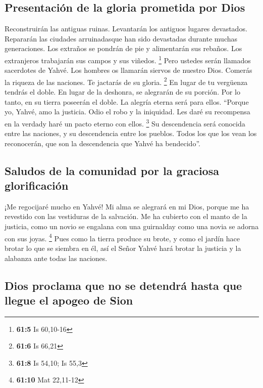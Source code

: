 \hypertarget{presentaciuxf3n-de-la-gloria-prometida-por-dios}{%
\subsection{Presentación de la gloria prometida por
Dios}\label{presentaciuxf3n-de-la-gloria-prometida-por-dios}}

 Reconstruirán las antiguas ruinas. Levantarán los
antiguos lugares devastados. Repararán las ciudades arruinadasque han
sido devastadas durante muchas generaciones.  Los extraños
se pondrán de pie y alimentarán sus rebaños. Los extranjeros trabajarán
sus campos y sus viñedos. \footnote{\textbf{61:5} Is 60,10-16}
 Pero ustedes serán llamados sacerdotes de Yahvé. Los
hombres os llamarán siervos de nuestro Dios. Comerás la riqueza de las
naciones. Te jactarás de su gloria. \footnote{\textbf{61:6} Is 66,21}
 En lugar de tu vergüenza tendrás el doble. En lugar de la
deshonra, se alegrarán de su porción. Por lo tanto, en su tierra
poseerán el doble. La alegría eterna será para ellos. 
``Porque yo, Yahvé, amo la justicia. Odio el robo y la iniquidad. Les
daré su recompensa en la verdady haré un pacto eterno con ellos.
\footnote{\textbf{61:8} Is 54,10; Is 55,3}  Su
descendencia será conocida entre las naciones, y su descendencia entre
los pueblos. Todos los que los vean los reconocerán, que son la
descendencia que Yahvé ha bendecido''.

\hypertarget{saludos-de-la-comunidad-por-la-graciosa-glorificaciuxf3n}{%
\subsection{Saludos de la comunidad por la graciosa
glorificación}\label{saludos-de-la-comunidad-por-la-graciosa-glorificaciuxf3n}}

 ¡Me regocijaré mucho en Yahvé! Mi alma se alegrará en mi
Dios, porque me ha revestido con las vestiduras de la salvación. Me ha
cubierto con el manto de la justicia, como un novio se engalana con una
guirnalday como una novia se adorna con sus joyas. \footnote{\textbf{61:10}
  Mat 22,11-12}  Pues como la tierra produce su brote, y
como el jardín hace brotar lo que se siembra en él, así el Señor Yahvé
hará brotar la justicia y la alabanza ante todas las naciones.

\hypertarget{dios-proclama-que-no-se-detendruxe1-hasta-que-llegue-el-apogeo-de-sion}{%
\subsection{Dios proclama que no se detendrá hasta que llegue el apogeo
de
Sion}\label{dios-proclama-que-no-se-detendruxe1-hasta-que-llegue-el-apogeo-de-sion}}

